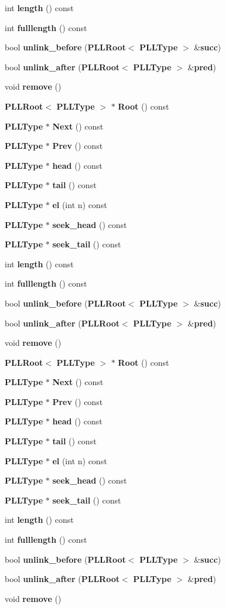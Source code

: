 \begin{CompactItemize}
int {\bf length} () const
\item 
int {\bf fulllength} () const
\item 
bool {\bf unlink\_\-before} ({\bf PLLRoot}$<$ {\bf PLLType} $>$ \&{\bf succ})
\item 
bool {\bf unlink\_\-after} ({\bf PLLRoot}$<$ {\bf PLLType} $>$ \&{\bf pred})
\item 
void {\bf remove} ()
\item 
{\bf PLLRoot}$<$ {\bf PLLType} $>$ $\ast$ {\bf Root} () const
\item 
{\bf PLLType} $\ast$ {\bf Next} () const
\item 
{\bf PLLType} $\ast$ {\bf Prev} () const
\item 
{\bf PLLType} $\ast$ {\bf head} () const
\item 
{\bf PLLType} $\ast$ {\bf tail} () const
\item 
{\bf PLLType} $\ast$ {\bf el} (int n) const
\item 
{\bf PLLType} $\ast$ {\bf seek\_\-head} () const
\item 
{\bf PLLType} $\ast$ {\bf seek\_\-tail} () const
\item 
int {\bf length} () const
\item 
int {\bf fulllength} () const
\item 
bool {\bf unlink\_\-before} ({\bf PLLRoot}$<$ {\bf PLLType} $>$ \&{\bf succ})
\item 
bool {\bf unlink\_\-after} ({\bf PLLRoot}$<$ {\bf PLLType} $>$ \&{\bf pred})
\item 
void {\bf remove} ()
\item 
{\bf PLLRoot}$<$ {\bf PLLType} $>$ $\ast$ {\bf Root} () const
\item 
{\bf PLLType} $\ast$ {\bf Next} () const
\item 
{\bf PLLType} $\ast$ {\bf Prev} () const
\item 
{\bf PLLType} $\ast$ {\bf head} () const
\item 
{\bf PLLType} $\ast$ {\bf tail} () const
\item 
{\bf PLLType} $\ast$ {\bf el} (int n) const
\item 
{\bf PLLType} $\ast$ {\bf seek\_\-head} () const
\item 
{\bf PLLType} $\ast$ {\bf seek\_\-tail} () const
\item 
int {\bf length} () const
\item 
int {\bf fulllength} () const
\item 
bool {\bf unlink\_\-before} ({\bf PLLRoot}$<$ {\bf PLLType} $>$ \&{\bf succ})
\item 
bool {\bf unlink\_\-after} ({\bf PLLRoot}$<$ {\bf PLLType} $>$ \&{\bf pred})
\item 
void {\bf remove} ()
\end{CompactItemize}
